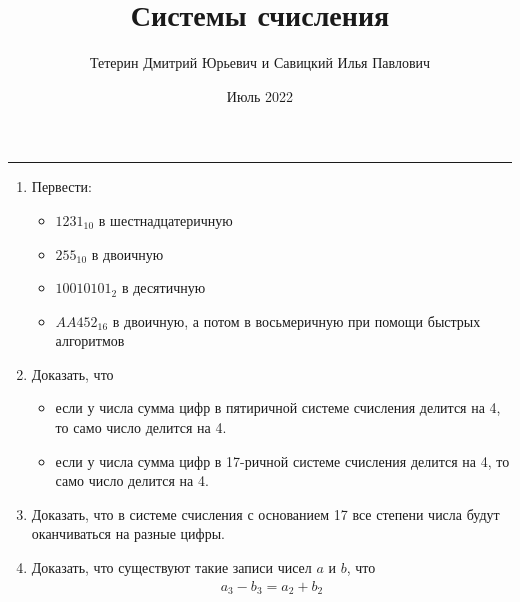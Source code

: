 \documentclass[a4paper,12pt]{extarticle}
\title{Системы счисления}
\author{Тетерин Дмитрий Юрьевич и Савицкий Илья Павлович}
\date{Июль 2022}
\begin{document}
    \maketitle
    \hrule
    \begin{enumerate}
        \item Первести:
        \begin{itemize}
            \item $1231_{10}$ в шестнадцатеричную
            \item $255_{10}$ в двоичную
            \item $10010101_2$ в десятичную
            \item $AA452_{16}$ в двоичную, а потом в восьмеричную при помощи быстрых алгоритмов
        \end{itemize}
        \item Доказать, что
        \begin{itemize}
            \item если у числа сумма цифр в пятиричной системе счисления делится на 4, то само число делится на 4.
            \item если у числа сумма цифр в 17-ричной системе счисления делится на 4, то само число делится на 4.
        \end{itemize}
        \item Доказать, что в системе счисления с основанием 17 все степени числа будут оканчиваться на разные цифры.
        \item Доказать, что существуют такие записи чисел $a$ и $b$, что
        \begin{gather*}
            a_3 - b_3 = a_2 + b_2
        \end{gather*}
        
    \end{enumerate}
\end{document}
